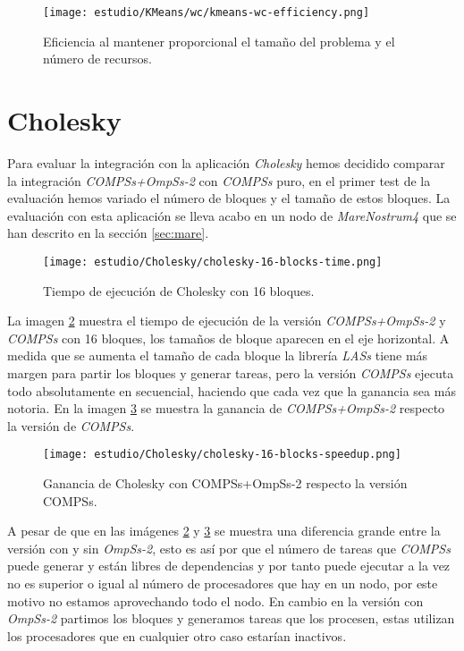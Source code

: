 \begin{figure}[H]
	\centering 
	\caption{Eficiencia al mantener proporcional el tamaño del problema y el número de recursos.}
	\texttt{[image: estudio/KMeans/wc/kmeans-wc-efficiency.png]}
	\label{fig:wc-effic}
\end{figure}

\section{Cholesky}

Para evaluar la integración con la aplicación \textit{Cholesky} hemos decidido comparar la integración \textit{COMPSs+OmpSs-2} con \textit{COMPSs} puro, en el primer test de la evaluación hemos variado el número de bloques y el tamaño de estos bloques. La evaluación con esta aplicación se lleva acabo en un nodo de \textit{MareNostrum4} que se han descrito en la sección \ref{sec:mare}.

\par\bigskip

\begin{figure}[H]
	\centering 
	\caption{Tiempo de ejecución de Cholesky con 16 bloques.}
	\texttt{[image: estudio/Cholesky/cholesky-16-blocks-time.png]}
	\label{fig:cholesky-16-time}
\end{figure}

La imagen \ref{fig:cholesky-16-time} muestra el tiempo de ejecución de la versión \textit{COMPSs+OmpSs-2} y \textit{COMPSs} con 16 bloques, los tamaños de bloque aparecen en el eje horizontal. A medida que se aumenta el tamaño de cada bloque la librería \textit{LASs} tiene más margen para partir los bloques y generar tareas, pero la versión \textit{COMPSs} ejecuta todo absolutamente en secuencial, haciendo que cada vez que la ganancia sea más notoria. En la imagen \ref{fig:cholesky-16-speedup} se muestra la ganancia de \textit{COMPSs+OmpSs-2} respecto la versión de \textit{COMPSs}.

\par\bigskip

\begin{figure}[H]
	\centering 
	\caption{Ganancia de Cholesky con COMPSs+OmpSs-2 respecto la versión COMPSs.}
	\texttt{[image: estudio/Cholesky/cholesky-16-blocks-speedup.png]}
	\label{fig:cholesky-16-speedup}
\end{figure}

A pesar de que en las imágenes \ref{fig:cholesky-16-time} y \ref{fig:cholesky-16-speedup} se muestra una diferencia grande entre la versión con y sin \textit{OmpSs-2}, esto es así por que el número de tareas que \textit{COMPSs} puede generar y están libres de dependencias y por tanto puede ejecutar a la vez no es superior o igual al número de procesadores que hay en un nodo, por este motivo no estamos aprovechando todo el nodo. En cambio en la versión con \textit{OmpSs-2} partimos los bloques y generamos tareas que los procesen, estas utilizan los procesadores que en cualquier otro caso estarían inactivos.

